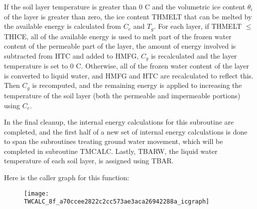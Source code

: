 If the soil layer temperature is greater than 0 C and the volumetric ice content $\theta_i$ of the layer is greater than zero, the ice content T\+H\+M\+E\+L\+T that can be melted by the available energy is calculated from $C_e$ and $T_g$. For each layer, if T\+H\+M\+E\+L\+T $\leq$ T\+H\+I\+C\+E, all of the available energy is used to melt part of the frozen water content of the permeable part of the layer, the amount of energy involved is subtracted from H\+T\+C and added to H\+M\+F\+G, $C_g$ is recalculated and the layer temperature is set to 0 C. Otherwise, all of the frozen water content of the layer is converted to liquid water, and H\+M\+F\+G and H\+T\+C are recalculated to reflect this. Then $C_g$ is recomputed, and the remaining energy is applied to increasing the temperature of the soil layer (both the permeable and impermeable portions) using $C_e$.

In the final cleanup, the internal energy calculations for this subroutine are completed, and the first half of a new set of internal energy calculations is done to span the subroutines treating ground water movement, which will be completed in subroutine T\+M\+C\+A\+L\+C. Lastly, T\+B\+A\+R\+W, the liquid water temperature of each soil layer, is assigned using T\+B\+A\+R.

Here is the caller graph for this function\+:\nopagebreak
\begin{figure}[H]
\begin{center}
\leavevmode
\texttt{[image: TWCALC\_8f\_a70ccee2822c2cc573ae3aca26942288a\_icgraph]}
\end{center}
\end{figure}


